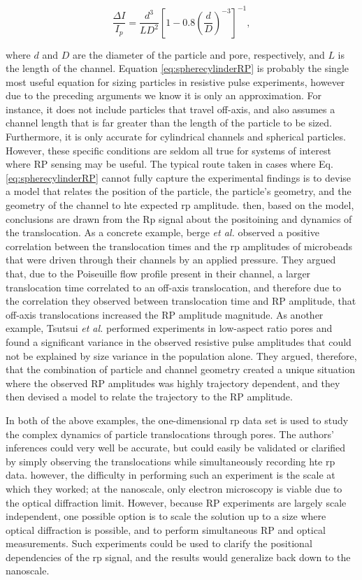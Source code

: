 		\begin{equation}\label{eq:spherecylinderRP}
			\frac{\Delta I}{I_{p}}=\frac{d^{3}}{LD^{2}}\left[1-0.8\left(\frac{d}{D}\right)^{-3}\right]^{-1},
		\end{equation}
		
		where $d$ and $D$ are the diameter of the particle and pore, respectively, and $L$ is the length of the channel. Equation \ref{eq:spherecylinderRP} is probably the single most useful equation for sizing particles in resistive pulse experiments, however due to the preceding arguments we know it is only an approximation. For instance, it does not include particles that travel off-axis, and also assumes a channel length that is far greater than the length of the particle to be sized. Furthermore, it is only accurate for cylindrical channels and spherical particles. However, these specific conditions are seldom all true for systems of interest where RP sensing may be useful. The typical route taken in cases where Eq. \ref{eq:spherecylinderRP} cannot fully capture the experimental findings is to devise a model that relates the position of the particle, the particle's geometry, and the geometry of the channel to hte expected rp amplitude. then, based on the model, conclusions are drawn from the Rp signal about the positoining and dynamics of the translocation. As a concrete example, berge \emph{et al.} observed a positive correlation between the translocation times and the rp amplitudes of microbeads that were driven through their channels by an applied pressure. They argued that, due to the Poiseuille flow profile present in their channel, a larger translocation time correlated to an off-axis translocation, and therefore due to the correlation they observed between translocation time and RP amplitude, that off-axis translocations increased the RP amplitude magnitude. As another example, Tsutsui \emph{et al.} performed experiments in low-aspect ratio pores and found a significant variance in the observed resistive pulse amplitudes that could not be explained by size variance in the population alone. They argued, therefore, that the combination of particle and channel geometry created a unique situation where the observed RP amplitudes was highly trajectory dependent, and they then devised a model to relate the trajectory to the RP amplitude.
		
		In both of the above examples, the one-dimensional rp data set is used to study the complex dynamics of particle translocations through pores. The authors' inferences could very well be accurate, but could easily be validated or clarified by simply observing the translocations while simultaneously recording hte rp data. however, the difficulty in performing such an experiment is the scale at which they worked; at the nanoscale, only electron microscopy is viable due to the optical diffraction limit. However, because RP experiments are largely scale independent, one possible option is to scale the solution up to a size where optical diffraction is possible, and to perform simultaneous RP and optical measurements. Such experiments could be used to clarify the positional dependencies of the rp signal, and the results would generalize back down to the nanoscale.
		
